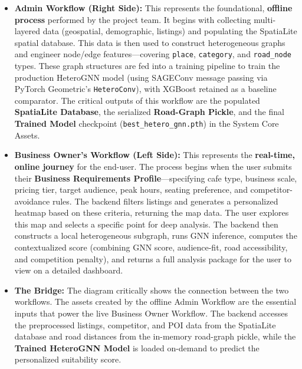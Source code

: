 \begin{itemize}
	\item \textbf{Admin Workflow (Right Side):} This represents the foundational, \textbf{offline process} performed by the project team. It begins with collecting multi-layered data (geospatial, demographic, listings) and populating the SpatiaLite spatial database. This data is then used to construct heterogeneous graphs and engineer node/edge features---covering \texttt{place}, \texttt{category}, and \texttt{road\_node} types. These graph structures are fed into a training pipeline to train the production HeteroGNN model (using SAGEConv message passing via PyTorch Geometric's \texttt{HeteroConv}), with XGBoost retained as a baseline comparator. The critical outputs of this workflow are the populated \textbf{SpatiaLite Database}, the serialized \textbf{Road-Graph Pickle}, and the final \textbf{Trained Model} checkpoint (\texttt{best\_hetero\_gnn.pth}) in the System Core Assets.

    \item \textbf{Business Owner's Workflow (Left Side):} This represents the \textbf{real-time, online journey} for the end-user. The process begins when the user submits their \textbf{Business Requirements Profile}---specifying cafe type, business scale, pricing tier, target audience, peak hours, seating preference, and competitor-avoidance rules. The backend filters listings and generates a personalized heatmap based on these criteria, returning the map data. The user explores this map and selects a specific point for deep analysis. The backend then constructs a local heterogeneous subgraph, runs GNN inference, computes the contextualized score (combining GNN score, audience-fit, road accessibility, and competition penalty), and returns a full analysis package for the user to view on a detailed dashboard.

    \item \textbf{The Bridge:} The diagram critically shows the connection between the two workflows. The assets created by the offline Admin Workflow are the essential inputs that power the live Business Owner Workflow. The backend accesses the preprocessed listings, competitor, and POI data from the SpatiaLite database and road distances from the in-memory road-graph pickle, while the \textbf{Trained HeteroGNN Model} is loaded on-demand to predict the personalized suitability score.
\end{itemize}

